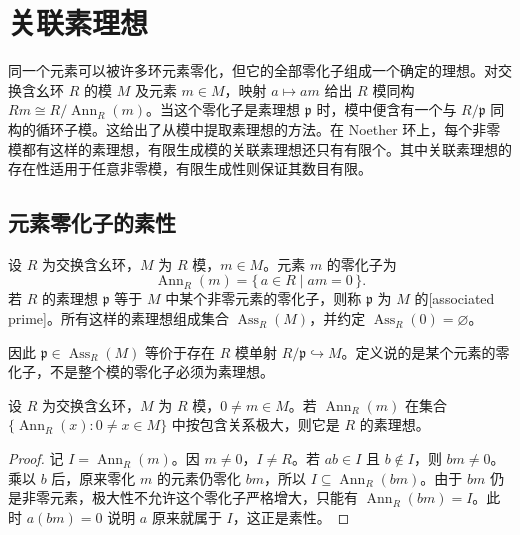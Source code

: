 
\section{关联素理想}
\label{b3:sec:0401}

同一个元素可以被许多环元素零化，但它的全部零化子组成一个确定的理想。对交换含幺环 \(R\) 的模 \(M\) 及元素 \(m\in M\)，映射 \(a\mapsto am\) 给出 \(R\) 模同构 \(Rm\cong R/\operatorname{Ann}_R(m)\)。当这个零化子是素理想 \(\mathfrak p\) 时，模中便含有一个与 \(R/\mathfrak p\) 同构的循环子模。这给出了从模中提取素理想的方法。在 Noether 环上，每个非零模都有这样的素理想，有限生成模的关联素理想还只有有限个。其中关联素理想的存在性适用于任意非零模，有限生成性则保证其数目有限。

\subsection{元素零化子的素性}
\label{b3:subsec:0401:01}

\begin{definition}\label{b3:def:associated-prime}
	设 \(R\) 为交换含幺环，\(M\) 为 \(R\) 模，\(m\in M\)。元素 \(m\) 的零化子为
	\[
		\operatorname{Ann}_R(m)=\{\,a\in R\mid am=0\,\}.
	\]
	若 \(R\) 的素理想 \(\mathfrak p\) 等于 \(M\) 中某个非零元素的零化子，则称 \(\mathfrak p\) 为 \(M\) 的[associated prime]。所有这样的素理想组成集合 \(\operatorname{Ass}_R(M)\)，并约定 \(\operatorname{Ass}_R(0)=\varnothing\)。
\end{definition}

因此 \(\mathfrak p\in\operatorname{Ass}_R(M)\) 等价于存在 \(R\) 模单射 \(R/\mathfrak p\hookrightarrow M\)。定义说的是某个元素的零化子，不是整个模的零化子必须为素理想。

\begin{lemma}\label{b3:lem:maximal-element-annihilator-prime}
	设 \(R\) 为交换含幺环，\(M\) 为 \(R\) 模，\(0\ne m\in M\)。若 \(\operatorname{Ann}_R(m)\) 在集合 \(\{\operatorname{Ann}_R(x):0\ne x\in M\}\) 中按包含关系极大，则它是 \(R\) 的素理想。
\end{lemma}
\begin{proof}
	记 \(I=\operatorname{Ann}_R(m)\)。因 \(m\ne0\)，\(I\ne R\)。若 \(ab\in I\) 且 \(b\notin I\)，则 \(bm\ne0\)。乘以 \(b\) 后，原来零化 \(m\) 的元素仍零化 \(bm\)，所以 \(I\subseteq\operatorname{Ann}_R(bm)\)。由于 \(bm\) 仍是非零元素，极大性不允许这个零化子严格增大，只能有 \(\operatorname{Ann}_R(bm)=I\)。此时 \(a(bm)=0\) 说明 \(a\) 原来就属于 \(I\)，这正是素性。
\end{proof}

